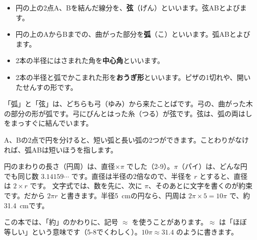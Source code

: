 \begin{itemize}[leftmargin=1.2\zw, itemsep=2pt, topsep=2pt, label={\color{\bkTT}●}]
\item 円の上の2点A、Bを結んだ線分を、\textbf{弦}（げん）といいます。弦ABとよびます。
\item 円の上のAからBまでの、曲がった部分を\textbf{弧}（こ）といいます。弧ABとよびます。
\item 2本の半径にはさまれた角を\textbf{中心角}といいます。
\item 2本の半径と弧でかこまれた形を\textbf{おうぎ形}といいます。ピザの1切れや、開いたせんすの形です。
\end{itemize}

\noindent\begin{minipage}[c]{0.66\linewidth}
「弧」と「弦」は、どちらも弓（ゆみ）から来たことばです。弓の、曲がった木の部分の形が弧です。弓にぴんとはった糸（つる）が弦です。弦は、弧の両はしをまっすぐに結んでいます。

A、Bの2点で円を分けると、短い弧と長い弧の2つができます。ことわりがなければ、弧ABは短いほうを指します。
\end{minipage}\hfill
\begin{minipage}[c]{0.3\linewidth}\centering
{}
\end{minipage}

円のまわりの長さ（円周）は、直径×$\pi$ でした（2-9）。$\pi$（パイ）は、どんな円でも同じ数 $3.14159\cdots$ です。直径は半径の2倍なので、半径を $r$ とすると、直径は $2\times r$ です。
文字式では、数を先に、次に $\pi$、そのあとに文字を書くのが約束です。だから $2\pi r$ と書きます。半径\qty{5}{cm}の円なら、円周は $2\pi\times5=10\pi$ で、約\qty{31.4}{cm}です。

この本では、「約」のかわりに、記号 $\approx$ を使うことがあります。$\approx$ は「ほぼ等しい」という意味です（5-8でくわしく）。$10\pi\approx31.4$ のように書きます。

